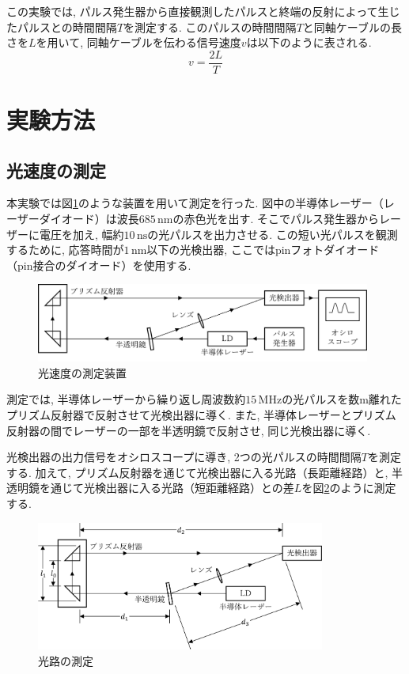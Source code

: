 \documentclass{jarticle}
\begin{document}
この実験では, パルス発生器から直接観測したパルスと終端の反射によって生じたパルスとの時間間隔$T$を測定する.
このパルスの時間間隔$T$と同軸ケーブルの長さを$L$を用いて, 同軸ケーブルを伝わる信号速度$v$は以下のように表される.
\begin{equation}
  v=\frac{2L}{T}
\end{equation}



\section{実験方法}


\subsection{光速度の測定}

本実験では図\ref{fg:lightspeed-method}のような装置を用いて測定を行った.
図中の半導体レーザー（レーザーダイオード）は波長$685\,\mathrm{nm}$の赤色光を出す.
そこでパルス発生器からレーザーに電圧を加え, 幅約$10\,\mathrm{ns}$の光パルスを出力させる.
この短い光パルスを観測するために, 応答時間が$1\,\mathrm{nm}$以下の光検出器, ここではpinフォトダイオード（pin接合のダイオード）を使用する.

\begin{figure}[H]
  \begin{center}
    \includegraphics[width=110mm]{experimental_method_picture.png}
    \caption{光速度の測定装置}
    \label{fg:lightspeed-method}
  \end{center}
\end{figure}

測定では, 半導体レーザーから繰り返し周波数約$15\,\mathrm{MHz}$の光パルスを数$\mathrm{m}$離れたプリズム反射器で反射させて光検出器に導く.
また, 半導体レーザーとプリズム反射器の間でレーザーの一部を半透明鏡で反射させ, 同じ光検出器に導く.

光検出器の出力信号をオシロスコープに導き, 2つの光パルスの時間間隔$T$を測定する.
加えて, プリズム反射器を通じて光検出器に入る光路（長距離経路）と, 半透明鏡を通じて光検出器に入る光路（短距離経路）との差$L$を図\ref{fg:lightspeed-distance}のように測定する.

\begin{figure}[H]
  \begin{center}
    \includegraphics[width=95mm]{experimental_distance_picture.png}
    \caption{光路の測定}
    \label{fg:lightspeed-distance}
  \end{center}
\end{figure}
\end{document}
